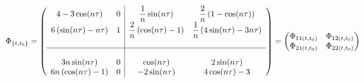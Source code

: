 \documentclass[11pt, a4paper]{article}
\begin{document}
\begin{equation}
    \Phi_{\left\{t,t_0\right\}} = \left(\begin{array}{cc|cc}
            4-3\cos(n\tau) & 0 &\displaystyle \frac{1}{n}\sin(n\tau) &\displaystyle \frac{2}{n}\left(1-\cos(n\tau)\right) \\ 
            6\left(\sin(n\tau)-n\tau\right) & 1 &\displaystyle \frac{2}{n}\left(\cos(n\tau)-1\right) &\displaystyle \frac{1}{n}\left(4\sin(n\tau)-3n\tau\right)\\ &&& \\ \hline &&& \\
            3n\sin(n\tau) & 0 & \cos(n\tau) & 2\sin(n\tau) \\
            6n\left(\cos(n\tau)-1\right) & 0 & -2\sin(n\tau) & 4\cos(n\tau)-3 
        \end{array}\right) = \begin{pmatrix}
            \Phi_{11(t,t_0)} & \Phi_{12(t,t_0)} \\
            \Phi_{21(t,t_0)} & \Phi_{22(t,t_0)}
        \end{pmatrix}
\end{equation}
\end{document}
